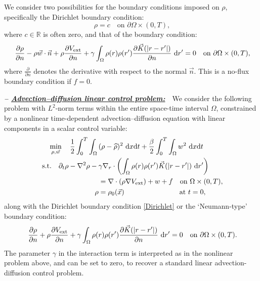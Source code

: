 We consider two possibilities for the boundary conditions imposed on $\rho$, specifically the Dirichlet boundary condition:
\begin{equation}
\ \label{Dirichlet} \rho=c\quad\text{on }\partial\Omega\times(0,T),
\end{equation}
where $c \in \mathbb{R}$ is often zero, and that of the boundary condition:
\begin{equation}
\ \label{NoFlux} \frac{\partial\rho}{\partial{}n}-\rho\vec{w}\cdot\vec{n}+\rho\frac{\partial{}V_{\text{ext}}}{\partial{}n} +\gamma\int_{\Omega}\rho(r)\rho(r') \frac{ \partial\vec{K}(|r-r'|)}{\partial{}n}~{\rm d}r'=0\quad\text{on }\partial\Omega\times(0,T),
\end{equation}
where $\frac{\partial}{\partial{}n}$ denotes the derivative with respect to the normal $\vec{n}$. This is a no-flux boundary condition if $f=0$.

\vspace{0.75em}

\textbf{\emph{-- \underline{Advection--diffusion linear control problem:}}}~~We consider the following problem with $L^2$-norm terms within the entire space-time interval $\Omega$, constrained by a nonlinear time-dependent advection--diffusion equation with linear components in a scalar control variable:
\begin{align}
\ \label{AdvDiff_Linear} \min_{\rho,\vec{w}}~~~\frac{1}{2}\int_0^T\int_{\Omega}{}&(\rho-\widehat{\rho})^2~{\rm d}x{\rm d}t+\frac{\beta}{2}\int_0^T\int_{\Omega}w^2~{\rm d}x{\rm d}t \\
\ \nonumber \text{s.t.}\quad\partial_{t}\rho-\nabla^{2}\rho-{}&\gamma\nabla_{r}\cdot\left(\int_{\Omega}\rho(r)\rho(r')\vec{K}(|r-r'|)~{\rm d}r'\right)\\
&\nonumber=\nabla\cdot(\rho\nabla{}V_{\text{ext}})+w+f\quad\text{on }\Omega\times(0,T), \\
\ \nonumber \rho&{}=\rho_{0}(\vec{x})\quad\hspace{6.8em}\text{at }t=0,
\end{align}
along with the Dirichlet boundary condition \eqref{Dirichlet} or the `Neumann-type' boundary condition:
\begin{equation}
\ \label{NoFlux_Linear} \frac{\partial\rho}{\partial{}n}+\rho\frac{\partial{}V_{\text{ext}}}{\partial{}n}+\gamma\int_{\Omega}\rho(r)\rho(r') \frac{ \partial\vec{K}(|r-r'|)}{\partial{}n}~{\rm d}r'=0\quad\text{on }\partial\Omega\times(0,T).
\end{equation}
The parameter $\gamma$ in the interaction term is interpreted as in the nonlinear problem above, and can be set to zero, to recover a standard linear advection-diffusion control problem. 
\vspace{0.75em}

